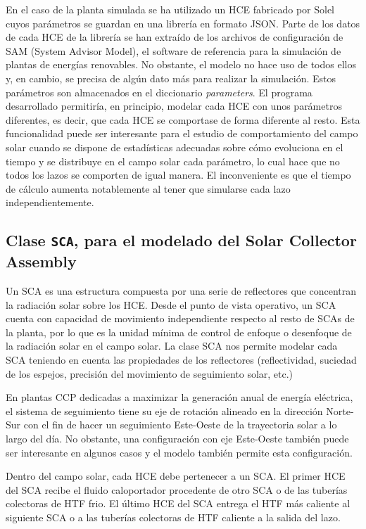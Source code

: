 En el caso de la planta simulada se ha utilizado un HCE fabricado por Solel cuyos parámetros se guardan en una librería en formato JSON. Parte de los datos de cada HCE de la librería se han extraído de los archivos de configuración de SAM (System Advisor Model), el software de referencia para la simulación de plantas de energías renovables. No obstante, el modelo no hace uso de todos ellos y, en cambio, se precisa de algún dato más para realizar la simulación. Estos parámetros son
almacenados en el diccionario \emph{parameters}. El programa desarrollado permitiría, en principio, modelar cada HCE con unos parámetros diferentes, es decir, que cada HCE se comportase de forma diferente al resto. Esta funcionalidad puede ser interesante para el estudio de comportamiento del campo solar cuando se dispone de estadísticas adecuadas sobre cómo evoluciona en el tiempo y se distribuye en el campo solar cada parámetro, lo cual hace que no todos los lazos se comporten de igual manera. El inconveniente es que el tiempo de cálculo aumenta notablemente al tener que simularse cada lazo independientemente. 


\subsection{Clase \texttt{SCA}, para el modelado del Solar Collector Assembly}
\label{solar-collector-assembly-sca}

Un SCA es una estructura compuesta por una serie de reflectores que concentran la radiación solar sobre los HCE. Desde el punto de vista operativo, un SCA cuenta con capacidad de movimiento independiente respecto al resto de SCAs de la planta, por lo que es la unidad mínima de control de enfoque o desenfoque de la radiación solar en el campo solar. La clase SCA nos permite modelar cada SCA teniendo en cuenta las propiedades de los reflectores (reflectividad, suciedad de los espejos, precisión del movimiento de seguimiento solar, etc.)

En plantas CCP dedicadas a maximizar la generación anual de energía eléctrica, el sistema de seguimiento tiene su eje de rotación alineado en la dirección Norte-Sur con el fin de hacer un seguimiento Este-Oeste de la trayectoria solar a lo largo del día. No obstante, una configuración con eje Este-Oeste también puede ser interesante en algunos casos y el modelo también permite esta configuración.

Dentro del campo solar, cada HCE debe pertenecer a un SCA. El primer HCE del SCA recibe el fluido caloportador procedente de otro SCA o de las tuberías colectoras de HTF frio. El último HCE del SCA entrega el HTF más caliente al siguiente SCA o a las tuberías colectoras de HTF caliente a la salida del lazo.

